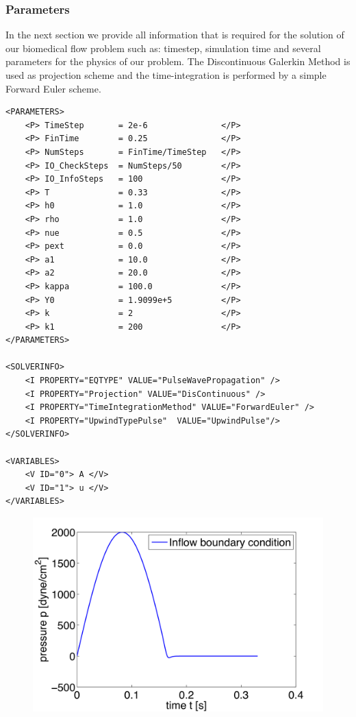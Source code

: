 \subsubsection{Parameters}

In the next section we provide all information that is required for the solution
of our biomedical flow problem such as: timestep, simulation time and several
parameters for the physics of our problem. The Discontinuous Galerkin
Method is used as projection scheme and the time-integration is performed by a
simple Forward Euler scheme.
\begin{lstlisting}[style=XmlStyle]
<PARAMETERS>
    <P> TimeStep       = 2e-6               </P>
    <P> FinTime        = 0.25               </P>
    <P> NumSteps       = FinTime/TimeStep   </P>
    <P> IO_CheckSteps  = NumSteps/50        </P>
    <P> IO_InfoSteps   = 100                </P>
    <P> T              = 0.33               </P>
    <P> h0             = 1.0                </P>
    <P> rho            = 1.0                </P>
    <P> nue            = 0.5                </P>
    <P> pext           = 0.0                </P>
    <P> a1             = 10.0               </P>
    <P> a2             = 20.0               </P>
    <P> kappa          = 100.0              </P>
    <P> Y0             = 1.9099e+5          </P>
    <P> k              = 2                  </P>
    <P> k1             = 200                </P>
</PARAMETERS>

<SOLVERINFO>
    <I PROPERTY="EQTYPE" VALUE="PulseWavePropagation" />
    <I PROPERTY="Projection" VALUE="DisContinuous" />
    <I PROPERTY="TimeIntegrationMethod" VALUE="ForwardEuler" />
    <I PROPERTY="UpwindTypePulse"  VALUE="UpwindPulse"/> 
</SOLVERINFO>

<VARIABLES>
    <V ID="0"> A </V>
    <V ID="1"> u </V>
</VARIABLES>
\end{lstlisting}

\begin{figure}
	\centering
	\includegraphics[width=0.49\linewidth]{Figures/Inflow.png}
	\caption{}
	\label{f:pulsewave:stented:inflow}
\end{figure}

